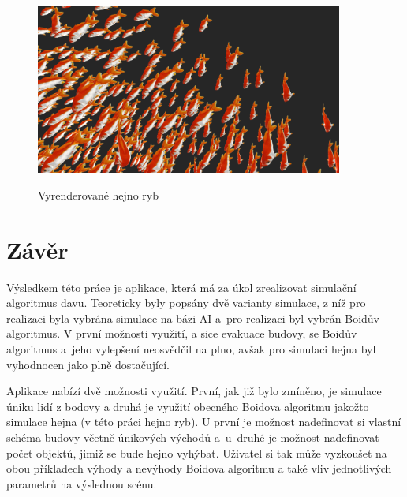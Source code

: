 \documentclass[czech,public,dept460,male,cpdeclaration]{diploma}
\begin{document}
\begin{figure}[H]\centering\includegraphics[width=0.9\textwidth]{Figures/fish6.jpg}\label{fig:hejnoRyb}
	\caption{Vyrenderované hejno ryb}\label{fig:hejnoRyb}
\end{figure}

\section{Závěr}
Výsledkem této práce je aplikace, která má za úkol zrealizovat simulační algoritmus davu. Teoreticky byly popsány dvě varianty simulace, z níž pro realizaci byla vybrána simulace na bázi AI a~pro realizaci byl vybrán Boidův algoritmus. V první možnosti využití, a sice evakuace budovy, se Boidův algoritmus a~jeho vylepšení neosvědčil na plno, avšak pro simulaci hejna byl vyhodnocen jako plně dostačující.

Aplikace nabízí dvě možnosti využití. První, jak již bylo zmíněno, je simulace úniku lidí z bodovy a druhá je využití obecného Boidova algoritmu jakožto simulace hejna (v této práci hejno ryb). U první je možnost nadefinovat si vlastní schéma budovy včetně únikových východů a~u~druhé je možnost nadefinovat počet objektů, jimiž se bude hejno vyhýbat. Uživatel si tak může vyzkoušet na obou příkladech výhody a nevýhody Boidova algoritmu a také vliv jednotlivých parametrů na výslednou scénu.

\newpage
\end{document}
